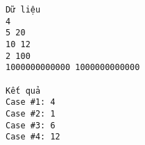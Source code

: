 \begin{verbatim}
Dữ liệu
4
5 20
10 12
2 100
1000000000000 1000000000000

Kết quả
Case #1: 4
Case #2: 1
Case #3: 6
Case #4: 12
\end{verbatim}
